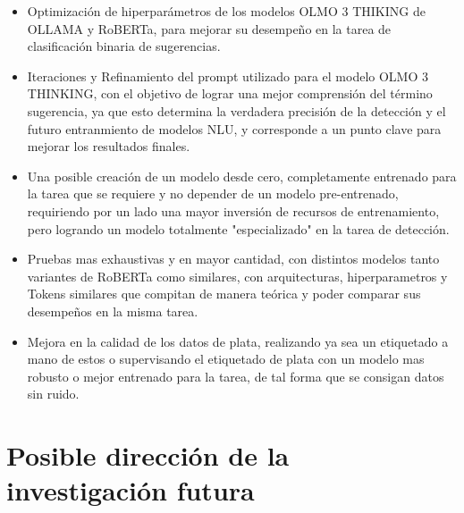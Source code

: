 \begin{itemize}
    \item Optimización de hiperparámetros de los modelos OLMO 3 THIKING de OLLAMA y RoBERTa, para mejorar su desempeño en la tarea de clasificación binaria de sugerencias.
    
    \item Iteraciones y Refinamiento del prompt utilizado para el modelo  OLMO 3 THINKING, con el objetivo de lograr una mejor comprensión del término sugerencia, ya que esto determina la verdadera precisión de la detección y el futuro entranmiento de modelos NLU, y corresponde a un punto clave para mejorar los resultados finales.
     
    \item Una posible creación de un modelo desde cero, completamente entrenado para la tarea que se requiere y no depender de un modelo pre-entrenado, requiriendo por un lado una mayor inversión de recursos de entrenamiento, pero logrando un modelo totalmente "especializado" en la tarea de detección.
    
    \item Pruebas mas exhaustivas y en mayor cantidad, con distintos modelos tanto variantes de RoBERTa como similares, con arquitecturas, hiperparametros y Tokens similares que compitan de manera teórica y poder comparar sus desempeños en la misma tarea.
    
    \item Mejora en la calidad de los datos de plata, realizando ya sea un etiquetado a mano de estos o supervisando el etiquetado de plata con un modelo mas robusto o mejor entrenado para la tarea, de tal forma que se consigan datos sin ruido.
    
\end{itemize}

\section{Posible dirección de la investigación futura}

